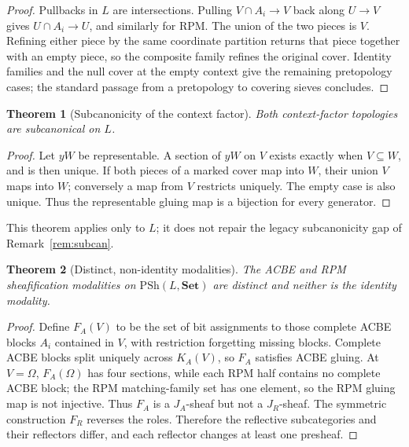 \documentclass[11pt]{amsart}
\newtheorem{theorem}{Theorem}[section]
\theoremstyle{definition}
\theoremstyle{remark}
\newcommand{\PSh}{\mathrm{PSh}}
\newcommand{\Set}{\mathbf{Set}}
\begin{document}
\begin{proof}
Pullbacks in $L$ are intersections. Pulling $V\cap A_i \to V$ back along $U \to V$ gives $U\cap A_i \to U$, and similarly for RPM. The union of the two pieces is $V$. Refining either piece by the same coordinate partition returns that piece together with an empty piece, so the composite family refines the original cover. Identity families and the null cover at the empty context give the remaining pretopology cases; the standard passage from a pretopology to covering sieves \cite{stacks00ZC} concludes.
\end{proof}

\begin{theorem}[Subcanonicity of the context factor]\label{thm:nt2-2}
Both context-factor topologies are subcanonical on $L$.
\end{theorem}

\begin{proof}
Let $yW$ be representable. A section of $yW$ on $V$ exists exactly when $V \subseteq W$, and is then unique. If both pieces of a marked cover map into $W$, their union $V$ maps into $W$; conversely a map from $V$ restricts uniquely. The empty case is also unique. Thus the representable gluing map is a bijection for every generator.
\end{proof}

This theorem applies only to $L$; it does not repair the legacy subcanonicity gap of Remark~\ref{rem:subcan}.

\begin{theorem}[Distinct, non-identity modalities]\label{thm:nt2-3}
The ACBE and RPM sheafification modalities on $\PSh(L,\Set)$ are distinct and neither is the identity modality.
\end{theorem}

\begin{proof}
Define $F_A(V)$ to be the set of bit assignments to those complete ACBE blocks $A_i$ contained in $V$, with restriction forgetting missing blocks. Complete ACBE blocks split uniquely across $K_A(V)$, so $F_A$ satisfies ACBE gluing. At $V=\Omega$, $F_A(\Omega)$ has four sections, while each RPM half contains no complete ACBE block; the RPM matching-family set has one element, so the RPM gluing map is not injective. Thus $F_A$ is a $J_A$-sheaf but not a $J_R$-sheaf. The symmetric construction $F_R$ reverses the roles. Therefore the reflective subcategories and their reflectors differ, and each reflector changes at least one presheaf.
\end{proof}
\end{document}
